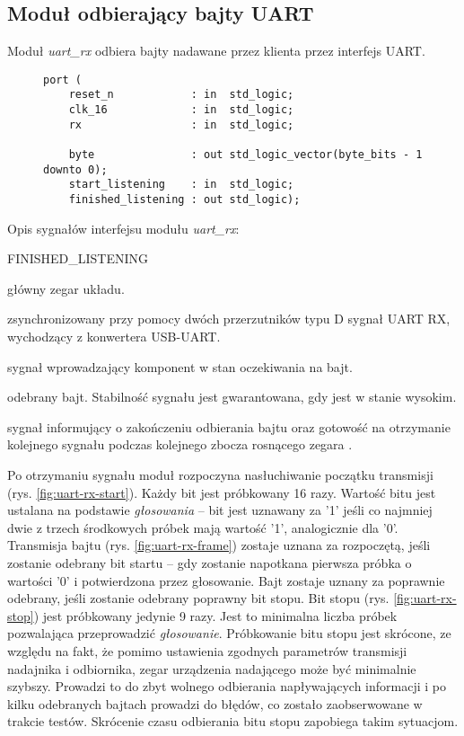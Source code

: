 \subsection{Moduł odbierający bajty UART}
\label{sec:uart-rx}
Moduł \textit{uart\_rx} odbiera bajty nadawane przez klienta przez interfejs UART.

\begin{figure}[!h]
\begin{lstlisting}[style=vhdl, captionpos=b, caption={\textit{uart\_rx} -- interfejs modułu}]
port (
	reset_n            : in  std_logic;
	clk_16             : in  std_logic;
	rx                 : in  std_logic;
		
	byte               : out std_logic_vector(byte_bits - 1 downto 0);
	start_listening    : in  std_logic;
	finished_listening : out std_logic);
\end{lstlisting}
\end{figure}

Opis sygnałów interfejsu modułu \textit{uart\_rx}:
\begin{interface}{FINISHED\_LISTENING}
	\item[\insignal{CLK\_16}] główny zegar układu.
	\item[\insignal{RX}] zsynchronizowany przy pomocy dwóch przerzutników typu D sygnał UART RX, wychodzący z konwertera USB-UART.
	\item[\insignal{START\_LISTENING}] sygnał wprowadzający komponent w stan oczekiwania na bajt.
	\item[\outsignal{BYTE[7:0]}] odebrany bajt. Stabilność sygnału jest gwarantowana, gdy  jest w stanie wysokim.
	\item[\outsignal{FINISHED\_LISTENING}] sygnał informujący o zakończeniu odbierania bajtu oraz gotowość na otrzymanie kolejnego sygnału  podczas kolejnego zbocza rosnącego zegara .
\end{interface}

Po otrzymaniu sygnału  moduł rozpoczyna nasłuchiwanie początku transmisji (rys. \ref{fig:uart-rx-start}). Każdy bit jest próbkowany 16 razy. Wartość bitu jest ustalana na podstawie \textit{głosowania} -- bit jest uznawany za {'1'} jeśli co najmniej dwie z trzech środkowych próbek mają wartość {'1'}, analogicznie dla {'0'}. Transmisja bajtu (rys. \ref{fig:uart-rx-frame}) zostaje uznana za rozpoczętą, jeśli zostanie odebrany bit startu -- gdy zostanie napotkana pierwsza próbka o wartości {'0'} i potwierdzona przez głosowanie. Bajt zostaje uznany za poprawnie odebrany, jeśli zostanie odebrany poprawny bit stopu. Bit stopu (rys. \ref{fig:uart-rx-stop}) jest próbkowany jedynie 9 razy. Jest to minimalna liczba próbek pozwalająca przeprowadzić \textit{głosowanie}. Próbkowanie bitu stopu jest skrócone, ze względu na fakt, że pomimo ustawienia zgodnych parametrów transmisji nadajnika i odbiornika, zegar urządzenia nadającego może być minimalnie szybszy. Prowadzi to do zbyt wolnego odbierania napływających informacji i po kilku odebranych bajtach prowadzi do błędów, co zostało zaobserwowane w trakcie testów. Skrócenie czasu odbierania bitu stopu zapobiega takim sytuacjom.

